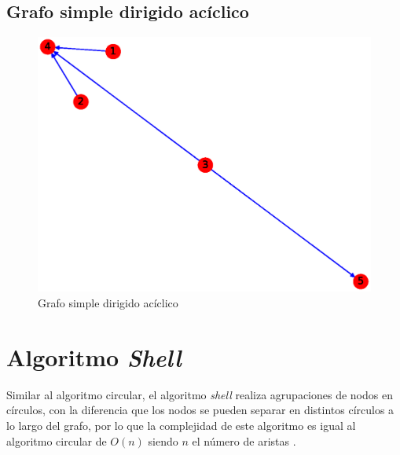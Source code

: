 \documentclass{article}
\begin{document}
\subsection{Grafo simple dirigido acíclico}
\begin{figure}[H]
    \includegraphics[width=\textwidth]{4-GSDA}
    \caption{Grafo simple dirigido acíclico}
    \label{fig:GSDA}
\end{figure}


\section{Algoritmo \textit{Shell}}
Similar al algoritmo circular, el algoritmo \textit{shell} realiza agrupaciones de nodos en círculos, con la diferencia que los nodos se pueden separar en distintos círculos a lo largo del grafo, por lo que la complejidad de este algoritmo es igual al algoritmo circular de $O(n)$ siendo $n$ el número de aristas \cite{shell}.
\end{document}
